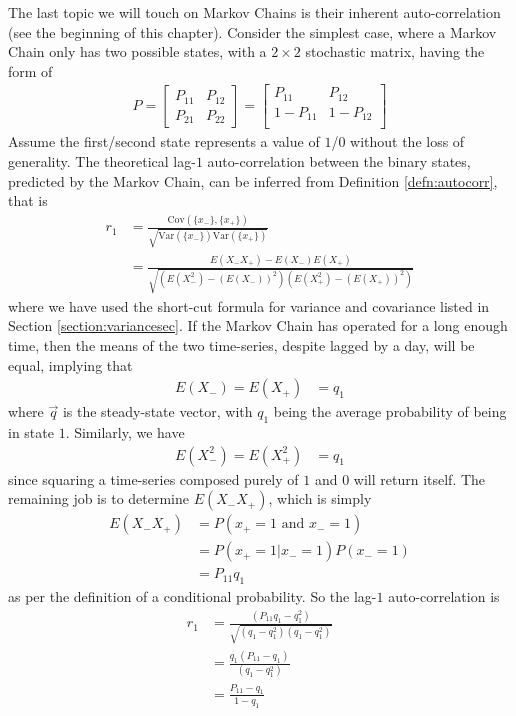 The last topic we will touch on Markov Chains is their inherent auto-correlation (see the beginning of this chapter). Consider the simplest case, where a Markov Chain only has two possible states, with a $2 \times 2$ stochastic matrix, having the form of
\begin{align*}
P = 
\begin{bmatrix}
P_{11} & P_{12} \\
P_{21} & P_{22}
\end{bmatrix}
=
\begin{bmatrix}
P_{11} & P_{12} \\
1 - P_{11} & 1 - P_{12} \\
\end{bmatrix}
\end{align*}
Assume the first/second state represents a value of $1$/$0$ without the loss of generality. The theoretical lag-$1$ auto-correlation between the binary states, predicted by the Markov Chain, can be inferred from Definition \ref{defn:autocorr}, that is
\begin{align*}
r_1 &= \frac{\text{Cov}(\{x_{-}\},\{x_{+}\})}{\sqrt{\text{Var}(\{x_{-}\}) \text{Var}(\{x_{+}\})}} \\
&= \frac{E(X_{-}X_{+}) - E(X_{-})E(X_{+})}{\sqrt{(E(X_{-}^2) - (E(X_{-}))^2)(E(X_{+}^2) - (E(X_{+}))^2)}}
\end{align*}
where we have used the short-cut formula for variance and covariance listed in Section \ref{section:variancesec}. If the Markov Chain has operated for a long enough time, then the means of the two time-series, despite lagged by a day, will be equal, implying that
\begin{align*}
E(X_{-}) = E(X_{+}) &= q_1
\end{align*}
where $\vec{q}$ is the steady-state vector, with $q_1$ being the average probability of being in state $1$. Similarly, we have
\begin{align*}
E(X_{-}^2) = E(X_{+}^2) &= q_1 
\end{align*}
since squaring a time-series composed purely of $1$ and $0$ will return itself. The remaining job is to determine $E(X_{-}X_{+})$, which is simply
\begin{align*}
E(X_{-}X_{+}) &= P(x_{+}=1 \text{ and } x_{-}=1) \\
&= P(x_{+}=1|x_{-}=1) P(x_{-}=1) \\
&= P_{11} q_1
\end{align*}
as per the definition of a conditional probability. So the lag-$1$ auto-correlation is
\begin{align}
r_1 &= \frac{(P_{11}q_1-q_1^2)}{\sqrt{(q_1-q_1^2)(q_1-q_1^2)}} \nonumber \\
&= \frac{q_1(P_{11}-q_1)}{(q_1-q_1^2)} \nonumber \\
&= \frac{P_{11}-q_1}{1-q_1} \label{eqn:binaryr1}
\end{align}
